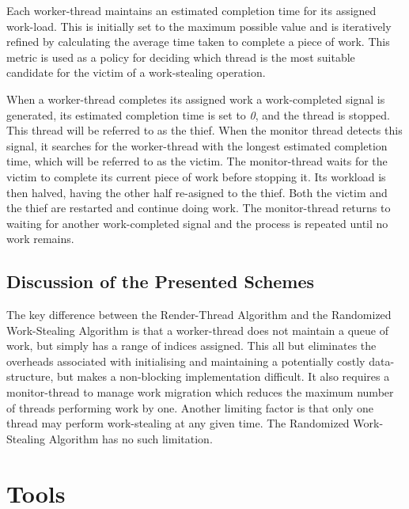 Each worker-thread maintains an estimated completion time for its assigned work-load. This is initially set to the maximum possible value and
is iteratively refined by calculating the average time taken to complete a piece of work. This metric is used as a policy for deciding which
thread is the most suitable candidate for the victim of a work-stealing operation.

When a worker-thread completes its assigned work a work-completed signal is generated, its estimated
completion time is set to \textit{0}, and the thread is stopped. This thread will be referred to as the thief.
When the monitor thread detects this signal, it searches for the worker-thread with the longest estimated completion time, 
which will be referred to as the victim. The \gls{monitor-thread} waits for the victim to complete its current piece of work before stopping it.
Its workload is then halved, having the other half re-asigned to the thief. Both the victim and the thief are restarted and continue doing work.
The monitor-thread returns to waiting for another work-completed signal and the process is repeated until no work remains.


\subsection*{Discussion of the Presented Schemes}
The key difference between the Render-Thread Algorithm and the Randomized Work-Stealing Algorithm 
is that a worker-thread does not maintain a queue of work, but simply has a range of indices assigned. 
This all but eliminates the overheads associated with initialising and 
maintaining a potentially costly data-structure, but makes a non-blocking implementation difficult. It also requires a monitor-thread to manage
work migration which reduces the maximum number of threads performing work by one. 
Another limiting factor is that only one thread may perform work-stealing at any given time. The Randomized Work-Stealing Algorithm has no such limitation.



\section{Tools}
\label{sec:restools}

